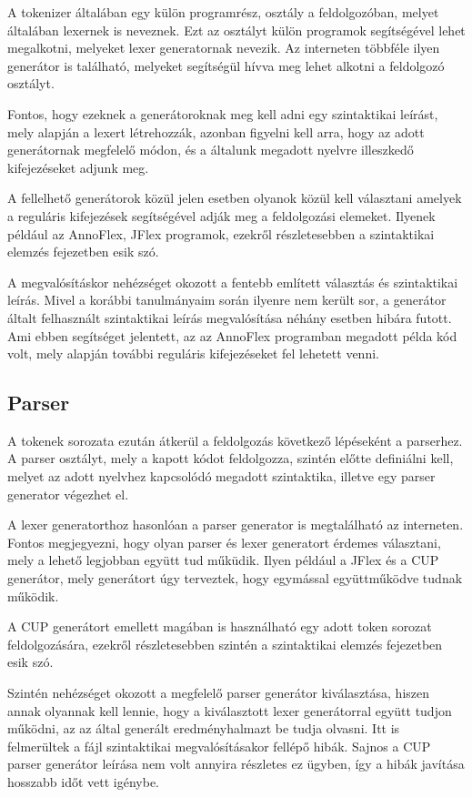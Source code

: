 A tokenizer általában egy külön programrész, osztály a feldolgozóban, melyet általában lexernek is neveznek. Ezt az osztályt külön programok segítségével lehet megalkotni, melyeket lexer generatornak nevezik. Az interneten többféle ilyen generátor is található, melyeket segítségül hívva meg lehet alkotni a feldolgozó osztályt.

Fontos, hogy ezeknek a generátoroknak meg kell adni egy szintaktikai leírást, mely alapján a lexert létrehozzák, azonban figyelni kell arra, hogy az adott generátornak megfelelő módon, és a általunk megadott nyelvre illeszkedő kifejezéseket adjunk meg.

A fellelhető generátorok közül jelen esetben olyanok közül kell választani amelyek a reguláris kifejezések segítségével adják meg a feldolgozási elemeket. Ilyenek  például az AnnoFlex, JFlex programok, ezekről részletesebben a szintaktikai elemzés fejezetben esik szó.

A megvalósításkor nehézséget okozott a fentebb említett választás és szintaktikai leírás. Mivel a korábbi tanulmányaim során ilyenre nem került sor, a generátor általt felhasznált szintaktikai leírás megvalósítása néhány esetben hibára futott. Ami ebben segítséget jelentett, az az AnnoFlex programban megadott példa kód volt, mely alapján további reguláris kifejezéseket fel lehetett venni.

\subsection{Parser}

A tokenek sorozata ezután átkerül a feldolgozás következő lépéseként a parserhez. A parser osztályt, mely a kapott kódot feldolgozza, szintén előtte definiálni kell, melyet az adott nyelvhez kapcsolódó megadott szintaktika, illetve egy parser generator végezhet el.

A lexer generatorthoz hasonlóan a parser generator is megtalálható az interneten. Fontos megjegyezni, hogy olyan parser és lexer generatort érdemes választani, mely a lehető legjobban együtt tud műküdik. Ilyen például a JFlex és a CUP generátor, mely generátort úgy terveztek, hogy egymással együttműködve tudnak működik.

A CUP generátort emellett magában is használható egy adott token sorozat feldolgozására, ezekről részletesebben szintén a szintaktikai elemzés fejezetben esik szó.

Szintén nehézséget okozott a megfelelő parser generátor kiválasztása, hiszen annak olyannak kell lennie, hogy a kiválasztott lexer generátorral együtt tudjon működni, az az által generált eredményhalmazt be tudja olvasni. Itt is felmerültek a fájl szintaktikai megvalósításakor fellépő hibák. Sajnos a CUP parser generátor leírása nem volt annyira részletes ez ügyben, így a hibák javítása hosszabb időt vett igénybe.

